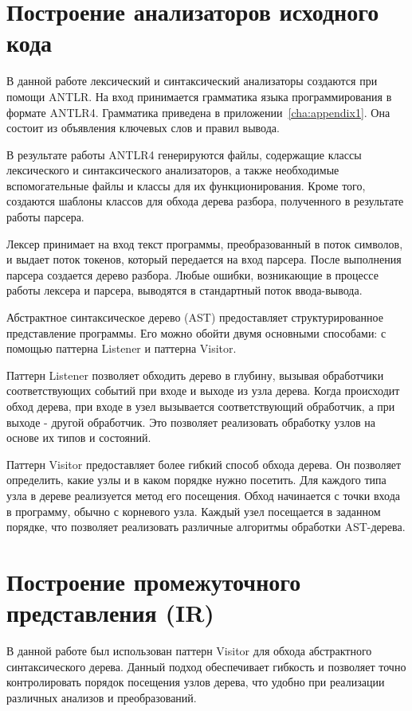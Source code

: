 \section{Построение анализаторов исходного кода}


В данной работе лексический и синтаксический анализаторы создаются при помощи ANTLR.
На вход принимается грамматика языка программирования в формате ANTLR4.
Грамматика приведена в приложении~\ref{cha:appendix1}.
Она состоит из объявления ключевых слов и правил вывода.


В результате работы ANTLR4 генерируются файлы, содержащие классы лексического и синтаксического анализаторов, а также необходимые вспомогательные файлы и классы для их функционирования.
Кроме того, создаются шаблоны классов для обхода дерева разбора, полученного в результате работы парсера.

Лексер принимает на вход текст программы, преобразованный в поток символов, и выдает поток токенов, который передается на вход парсера.
После выполнения парсера создается дерево разбора.
Любые ошибки, возникающие в процессе работы лексера и парсера, выводятся в стандартный поток ввода-вывода.


Абстрактное синтаксическое дерево (AST) предоставляет структурированное представление программы.
Его можно обойти двумя основными способами: с помощью паттерна Listener и паттерна Visitor.

Паттерн Listener позволяет обходить дерево в глубину, вызывая обработчики соответствующих событий при входе и выходе из узла дерева.
Когда происходит обход дерева, при входе в узел вызывается соответствующий обработчик, а при выходе - другой обработчик.
Это позволяет реализовать обработку узлов на основе их типов и состояний.

Паттерн Visitor предоставляет более гибкий способ обхода дерева.
Он позволяет определить, какие узлы и в каком порядке нужно посетить.
Для каждого типа узла в дереве реализуется метод его посещения.
Обход начинается с точки входа в программу, обычно с корневого узла.
Каждый узел посещается в заданном порядке, что позволяет реализовать различные алгоритмы обработки AST-дерева.


\section{Построение промежуточного представления (IR)}


В данной работе был использован паттерн Visitor для обхода абстрактного синтаксического дерева.
Данный подход обеспечивает гибкость и позволяет точно контролировать порядок посещения узлов дерева, что удобно при реализации различных анализов и преобразований.

